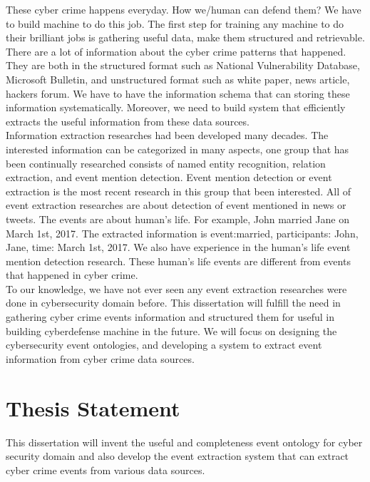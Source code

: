 These cyber crime happens everyday. How we/human can defend them? We have to build machine to do this job. The first step for training any machine to do their brilliant jobs is gathering useful data, make them structured and retrievable. There are a lot of information about the cyber crime patterns that happened. They are both in the structured format such as National Vulnerability Database, Microsoft Bulletin, and unstructured format such as white paper, news article, hackers forum. We have to have the information schema that can storing these information systematically. Moreover, we need to build system that efficiently extracts the useful information from these data sources.\\
\indent Information extraction researches had been developed many decades. The interested information can be categorized in many aspects, one group that has been continually researched consists of named entity recognition, relation extraction, and event mention detection. Event mention detection or event extraction is the most recent research in this group that been interested. All of event extraction researches are about detection of event mentioned in news or tweets. The events are about human’s life. For example, John married Jane on March 1st, 2017. The extracted information is event:married, participants: John, Jane, time: March 1st, 2017. We also have experience in the human’s life event mention detection research. These human’s life events are different from events that happened in cyber crime.\\
\indent To our knowledge, we have not ever seen any event extraction researches were done in cybersecurity domain before. This dissertation will fulfill the need in gathering cyber crime events information and structured them for useful in building cyberdefense machine in the future. We will focus on designing the cybersecurity event ontologies, and developing a system to extract event information from cyber crime data sources.

\section{Thesis Statement}
\label{statement}
This dissertation will invent the useful and completeness event ontology for cyber security domain and also develop the event extraction system that can extract cyber crime events from various data sources.
